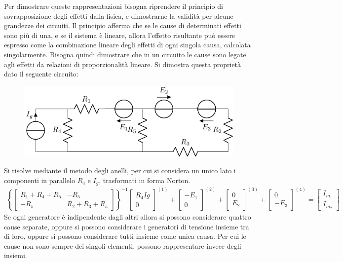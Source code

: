 \documentclass{article}
\numberwithin{equation}{subsection}
\begin{document}
Per dimostrare queste rappresentazioni bisogna riprendere il principio di sovrapposizione degli effetti dalla fisica, e dimostrarne la validità per alcune grandezze dei 
circuiti. Il principio afferma che se le cause di determinati effetti sono più di una, e se il sistema è lineare, allora l'effetto risultante può essere espresso come la 
combinazione lineare degli effetti di ogni singola causa, calcolata singolarmente. 
Bisogna quindi dimostrare che in un circuito le cause sono legate agli effetti da relazioni di proporzionalità lineare. 
Si dimostra questa proprietà dato il seguente circuito:
\begin{figure}[H]%
    \centering
    \includegraphics{circuito-7.pdf}
    \label{fig:circuito-7}
\end{figure}
Si risolve mediante il metodo degli anelli, per cui si considera un unico lato i componenti in parallelo $R_4$ e $I_g$, trasformati in forma Norton. 
\begin{gather*}
    \left\{\begin{bmatrix}
        R_1+R_4+R_5&-R_5\\
        -R_5&R_2+R_3+R_5
    \end{bmatrix}\right\}^{-1}
            \begin{bmatrix}
                R_4Ig\\
                0
            \end{bmatrix}^{(1)}+
            \begin{bmatrix}
                -E_1\\
                0
            \end{bmatrix}^{(2)}+
            \begin{bmatrix}
                0\\
                E_2
            \end{bmatrix}^{(3)}+
            \begin{bmatrix}
                0\\
                -E_3
            \end{bmatrix}^{(4)}
    =\begin{bmatrix}
        I_{m_1}\\
        I_{m_2}
    \end{bmatrix}
\end{gather*}
Se ogni generatore è indipendente dagli altri allora si possono considerare quattro cause separate, oppure si possono considerare i generatori di tensione insieme tra di loro, 
oppure si possono considerare tutti insieme come unica causa. Per cui le cause non sono sempre dei singoli elementi, possono rappresentare invece degli insiemi. 
\end{document}
